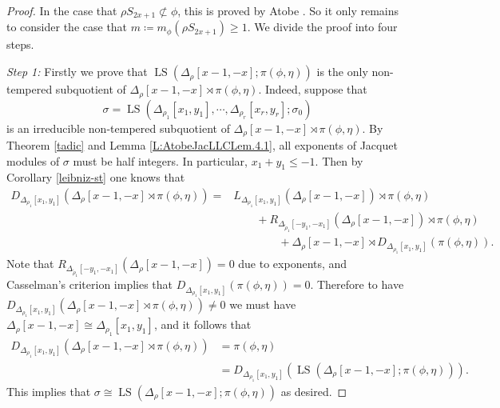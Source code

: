 \documentclass[11pt,letterpaper]{amsart}
\theoremstyle{plain}
\numberwithin{theorem}{section}
\numberwithin{equation}{subsection}
\theoremstyle{remark}
\newcommand{\LS}{\operatorname{LS}} %
\begin{document}
\begin{proof}
In the case that $\rho S_{2x+1}\not\subset \phi$, this is proved by Atobe \cite[Prop. 5.2]{MR4055180}. So it only remains to consider the case that $m\coloneqq m_\phi\left(\rho S_{2x+1}\right)\geq 1$. We divide the proof into four steps.

\vskip 5pt

\emph{Step 1:} Firstly we prove that $\LS\left(\Delta_\rho\left[x-1,-x\right];\pi\left(\phi,\eta\right)\right)$ is the only non-tempered subquotient of $\Delta_\rho\left[x-1,-x\right] \rtimes \pi\left(\phi,\eta\right)$. Indeed, suppose that 
\[
    \sigma = \LS\left(\Delta_{\rho_1}[x_1,y_1],\cdots,\Delta_{\rho_r}[x_r,y_r];\sigma_0\right)
\]
is an irreducible non-tempered subquotient of $\Delta_\rho\left[x-1,-x\right] \rtimes \pi\left(\phi,\eta\right)$. By Theorem \ref{tadic} and Lemma \ref{L:AtobeJacLLCLem.4.1}, all exponents of Jacquet modules of $\sigma$ must be half integers. In particular, $x_1+y_1\leq -1$. Then by Corollary \ref{leibniz-st} one knows that
\begin{align*}
    D_{\Delta_{\rho_1}[x_1,y_1]}\left(\Delta_\rho\left[x-1,-x\right] \rtimes \pi\left(\phi,\eta\right)\right) = &L_{\Delta_{\rho_1}[x_1,y_1]}\left(\Delta_\rho\left[x-1,-x\right]\right)\rtimes \pi\left(\phi,\eta\right)\\
    & \qquad + R_{\Delta_{\widetilde{\rho}_1}[-y_1,-x_1]}\left(\Delta_\rho\left[x-1,-x\right]\right)\rtimes \pi\left(\phi,\eta\right)\\
    & \qquad \qquad + \Delta_\rho\left[x-1,-x\right] \rtimes D_{\Delta_{\rho_1}[x_1,y_1]}\left(\pi\left(\phi,\eta\right)\right).
\end{align*}
Note that $R_{\Delta_{\widetilde{\rho}_1}[-y_1,-x_1]}\left(\Delta_\rho\left[x-1,-x\right]\right)=0$ due to exponents, and Casselman's criterion implies that $D_{\Delta_{\rho_1}[x_1,y_1]}\left(\pi\left(\phi,\eta\right)\right)=0$. Therefore to have $D_{\Delta_{\rho_1}[x_1,y_1]}\left(\Delta_\rho\left[x-1,-x\right] \rtimes \pi\left(\phi,\eta\right)\right)\neq 0$ we must have $\Delta_\rho\left[x-1,-x\right]\cong \Delta_{\rho_1}[x_1,y_1]$, and it follows that
\begin{align*}
    D_{\Delta_{\rho_1}[x_1,y_1]}\left(\Delta_\rho\left[x-1,-x\right] \rtimes \pi\left(\phi,\eta\right)\right) &= \pi\left(\phi,\eta\right)\\
    & = D_{\Delta_{\rho_1}[x_1,y_1]}\left(\LS\left(\Delta_\rho\left[x-1,-x\right] ; \pi\left(\phi,\eta\right)\right)\right).
\end{align*}
This implies that $\sigma \cong \LS\left(\Delta_\rho\left[x-1,-x\right]; \pi\left(\phi,\eta\right)\right)$ as desired.


\end{proof}
\end{document}
